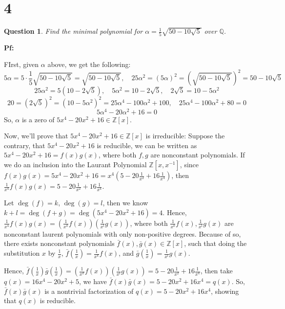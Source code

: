 \documentclass{article}
\newtheorem{question}{Question}
\begin{document}
\hfil

\hfil

\section*{4}
\begin{myBox}[]{}
    \begin{question}
        Find the minimal polynomial for $\alpha=\frac{1}{5}\sqrt{50-10\sqrt{5}}$ over $\mathbb{Q}$.
    \end{question}
\end{myBox}

\textbf{Pf:}

FIrst, given $\alpha$ above, we get the following:
$$5\alpha = 5\cdot \frac{1}{5}\sqrt{50-10\sqrt{5}}=\sqrt{50-10\sqrt{5}},\quad 25\alpha^2=(5\alpha)^2=\left(\sqrt{50-10\sqrt{5}}\right)^2=50-10\sqrt{5}$$
$$25\alpha^2=5(10-2\sqrt{5}),\quad 5\alpha^2=10-2\sqrt{5},\quad 2\sqrt{5}=10-5\alpha^2$$
$$20=(2\sqrt{5})^2=(10-5\alpha^2)^2=25\alpha^4-100\alpha^2+100,\quad 25\alpha^4-100\alpha^2+80=0$$
$$5\alpha^4-20\alpha^2+16=0$$
So, $\alpha$ is a zero of $5x^4-20x^2+16\in\mathbb{Z}[x]$.

\hfil

Now, we'll prove that $5x^4-20x^2+16\in\mathbb{Z}[x]$ is irreducible: Suppose the contrary, that $5x^4-20x^2+16$ is reducible, we can be written as $5x^4-20x^2+16=f(x)g(x)$, where both $f,g$ are nonconstant polynomials.
If we do an inclusion into the Laurant Polynomial $\mathbb{Z}[x,x^{-1}]$, since $f(x)g(x)=5x^4-20x^2+16 = x^4(5-20\frac{1}{x^2}+16\frac{1}{x^4})$,
then $\frac{1}{x^4}f(x)g(x)=5-20\frac{1}{x^2}+16\frac{1}{x^4}$.

Let $\deg(f)=k$, $\deg(g)=l$, then we know $k+l=\deg(f+g)=\deg(5x^4-20x^2+16)=4$. Hence, $\frac{1}{x^4}f(x)g(x)=\left(\frac{1}{x^k}f(x)\right)\left(\frac{1}{x^l}g(x)\right)$,  where both $\frac{1}{x^k}f(x),\frac{1}{x^l}g(x)$ are nonconstant laurent polynomials with only non-positive degrees.
Because of so, there exists nonconstant polynomials $\bar{f}(x),\bar{g}(x)\in\mathbb{Z}[x]$, such that doing the substitution $x$ by $\frac{1}{x}$, $\bar{f}(\frac{1}{x})=\frac{1}{x^k}f(x)$, and $\bar{g}(\frac{1}{x})=\frac{1}{x^l}g(x)$.

Hence, $\bar{f}(\frac{1}{x})\bar{g}(\frac{1}{x})=\left(\frac{1}{x^k}f(x)\right)\left(\frac{1}{x^l}g(x)\right)=5-20\frac{1}{x^2}+16\frac{1}{x^4}$, then take $q(x)=16x^4-20x^2+5$, we have $\bar{f}(x)\bar{g}(x)=5-20x^2+16x^4=q(x)$.
So, $\bar{f}(x)\bar{g}(x)$ is a nontrivial factorization of $q(x)=5-20x^2+16x^4$, showing that $q(x)$ is reducible.
\end{document}
